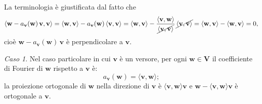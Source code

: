\documentclass{article}
\theoremstyle{plain}
\theoremstyle{definition}
\theoremstyle{remark}
\newtheorem{case}{Caso}
\begin{document}
\vspace{10pt}

La terminologia è giustificata dal fatto che
\[
\langle \mathbf{w} - a_\mathbf{v}(\mathbf{w}) \, \mathbf{v}, \mathbf{v} \rangle 
= \langle \mathbf{w}, \mathbf{v} \rangle - a_\mathbf{v}(\mathbf{w}) \, \langle \mathbf{v}, \mathbf{v} \rangle 
= \langle \mathbf{w}, \mathbf{v} \rangle - \dfrac{\langle \mathbf{v}, \mathbf{w} \rangle}{\cancel{\langle \mathbf{v}, \mathbf{v} \rangle}} \, \cancel{\langle \mathbf{v}, \mathbf{v} \rangle}
= \langle \mathbf{w}, \mathbf{v} \rangle - \langle \mathbf{w}, \mathbf{v} \rangle = 0,
\]
cioè $\mathbf{w} - a_\mathbf{v}(\mathbf{w}) \, \mathbf{v}$ è perpendicolare a $\mathbf{v}$.

\vspace{10pt}

\begin{case}
Nel caso particolare in cui $\mathbf{v}$ è un versore, per ogni $\mathbf{w} \in \mathbf{V}$ il coefficiente di 
Fourier di $\mathbf{w}$ rispetto a $\mathbf{v}$ è:
\[
a_\mathbf{v}(\mathbf{w}) = \langle \mathbf{v}, \mathbf{w} \rangle;
\]
la proiezione ortogonale di $\mathbf{w}$ nella direzione di $\mathbf{v}$ è 
$\langle \mathbf{v}, \mathbf{w} \rangle \mathbf{v}$ e 
$\mathbf{w} - \langle \mathbf{v}, \mathbf{w} \rangle \mathbf{v}$ è ortogonale a $\mathbf{v}$.    
\end{case}

\vspace{10pt}
\end{document}
